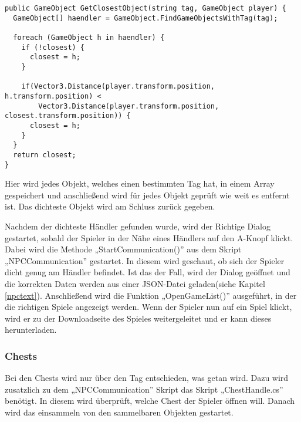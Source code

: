 \begin{scriptsize}
\lstset{
	float,
	caption=Methode GetClosestObject aus FindNearestHandler.cs, 
	language=[Sharp]C, 
	frame=single,  
	showstringspaces=false, 
	showspaces=false, 
	numbers=left, 
	captionpos=b, 
	belowcaptionskip=4pt,
	basicstyle=\ttfamily
} 
\begin{lstlisting}[label=lst:getclosest]
public GameObject GetClosestObject(string tag, GameObject player) {
  GameObject[] haendler = GameObject.FindGameObjectsWithTag(tag);

  foreach (GameObject h in haendler) {
    if (!closest) {
      closest = h;
    }
           
    if(Vector3.Distance(player.transform.position, h.transform.position) < 
    	Vector3.Distance(player.transform.position, closest.transform.position)) {
      closest = h;
    }
  }
  return closest;
} 
\end{lstlisting}
\end{scriptsize}

Hier wird jedes Objekt, welches einen bestimmten Tag hat, in einem Array gespeichert und anschließend wird für jedes Objekt geprüft wie weit es entfernt ist. Das dichteste Objekt wird am Schluss zurück gegeben.

Nachdem der dichteste Händler gefunden wurde, wird der Richtige Dialog gestartet, sobald der Spieler in der Nähe eines Händlers auf den A-Knopf klickt. Dabei wird die Methode „StartCommunication()” aus dem Skript „NPCCommunication” gestartet. In diesem wird geschaut, ob sich der Spieler dicht genug am Händler befindet. Ist das der Fall, wird der Dialog geöffnet und die korrekten Daten werden aus einer \ac{JSON}-Datei geladen(siehe Kapitel \ref{npctext}). Anschließend wird die Funktion „OpenGameList()” ausgeführt, in der die richtigen Spiele angezeigt werden. Wenn der Spieler nun auf ein Spiel klickt, wird er zu der Downloadseite des Spieles weitergeleitet und er kann dieses herunterladen.

\subsubsection{Chests}

Bei den Chests wird nur über den Tag entschieden, was getan wird. Dazu wird zusatzlich zu dem „NPCCommunication” Skript das Skript „ChestHandle.cs” benötigt. In diesem wird überprüft, welche Chest der Spieler öffnen will. Danach wird das einsammeln von den sammelbaren Objekten gestartet.


